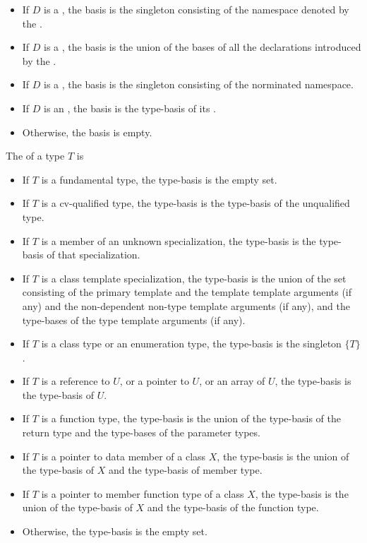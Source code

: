 \begin{undecided}
\begin{std.txt}
\begin{itemize}
    \item If $D$ is a , the basis is the 
    singleton consisting of the namespace denoted by the
    .

    \item If $D$ is a , the basis is the union
    of the bases of all the declarations introduced by
    the .

    \item If $D$ is a , the basis is the
     singleton consisting of the norminated namespace.

    \item If $D$ is an , the basis is the type-basis of
    its .

    \item Otherwise, the basis is empty.
  \end{itemize}

  The  of a type $T$ is
  \begin{itemize}
    \item If $T$ is a fundamental type, the type-basis is the empty set.
    \item If $T$ is a cv-qualified type, the type-basis is the type-basis of
    the unqualified type.
    \item If $T$ is a member of an unknown specialization, the type-basis
    is the type-basis of that specialization.
    \item If $T$ is a class template specialization, the type-basis
    is the union of the set consisting of the primary template and the
    template template arguments (if any) and the non-dependent non-type
    template arguments (if any), and the type-bases of the type 
    template arguments (if any).
    \item If $T$ is a class type or an enumeration type, 
    the type-basis is the singleton $\{ T \}$.
    \item If $T$ is a reference to $U$, or a pointer to $U$, or an array of $U$, the
    type-basis is the type-basis of $U$.
    \item If $T$ is a function type, the type-basis is the union of the
    type-basis of the return type and the type-bases of the parameter types.
    \item If $T$ is a pointer to data member of a class $X$, the type-basis is
    the union of the type-basis of $X$ and the type-basis of member type.
    \item If $T$ is a pointer to member function type of a class $X$, the
    type-basis is the union of the type-basis of $X$ and the type-basis of
    the function type.
    \item Otherwise, the type-basis is the empty set.
  \end{itemize}


\end{std.txt}
\end{undecided}
